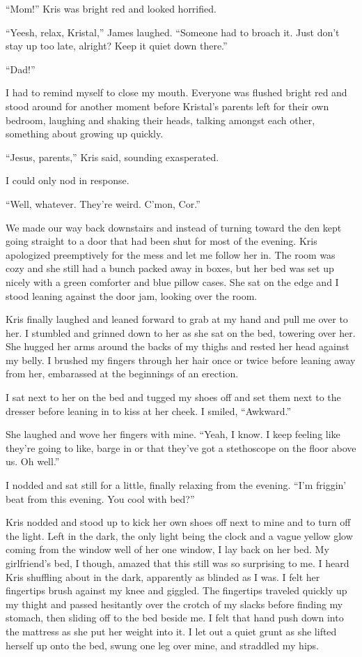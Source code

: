 ``Mom!''  Kris was bright red and looked horrified.

``Yeesh, relax, Kristal,'' James laughed.  ``Someone had to broach it.  Just don't stay up too late, alright?  Keep it quiet down there.''

``Dad!''

I had to remind myself to close my mouth.  Everyone was flushed bright red and stood around for another moment before Kristal's parents left for their own bedroom, laughing and shaking their heads, talking amongst each other, something about growing up quickly.

``Jesus, parents,'' Kris said, sounding exasperated.

I could only nod in response.

``Well, whatever.  They're weird.  C'mon, Cor.''

We made our way back downstairs and instead of turning toward the den kept going straight to a door that had been shut for most of the evening.  Kris apologized preemptively for the mess and let me follow her in.  The room was cozy and she still had a bunch packed away in boxes, but her bed was set up nicely with a green comforter and blue pillow cases.  She sat on the edge and I stood leaning against the door jam, looking over the room.

Kris finally laughed and leaned forward to grab at my hand and pull me over to her.  I stumbled and grinned down to her as she sat on the bed, towering over her.  She hugged her arms around the backs of my thighs and rested her head against my belly.  I brushed my fingers through her hair once or twice before leaning away from her, embarassed at the beginnings of an erection.

I sat next to her on the bed and tugged my shoes off and set them next to the dresser before leaning in to kiss at her cheek.  I smiled, ``Awkward.''

She laughed and wove her fingers with mine.  ``Yeah, I know.  I keep feeling like they're going to like, barge in or that they've got a stethoscope on the floor above us.  Oh well.''

I nodded and sat still for a little, finally relaxing from the evening.  ``I'm friggin' beat from this evening.  You cool with bed?''

Kris nodded and stood up to kick her own shoes off next to mine and to turn off the light.  Left in the dark, the only light being the clock and a vague yellow glow coming from the window well of her one window, I lay back on her bed.  My girlfriend's bed, I though, amazed that this still was so surprising to me.  I heard Kris shuffling about in the dark, apparently as blinded as I was.  I felt her fingertips brush against my knee and giggled.  The fingertips traveled quickly up my thight and passed hesitantly over the crotch of my slacks before finding my stomach, then sliding off to the bed beside me.  I felt that hand push down into the mattress as she put her weight into it.  I let out a quiet grunt as she lifted herself up onto the bed, swung one leg over mine, and straddled my hips.

